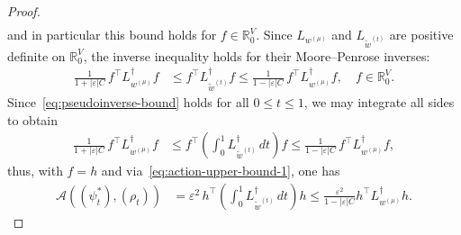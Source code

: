 \documentclass[11pt,a4paper]{article}
\begin{document}
\begin{proof}
\begin{align*}
        \end{align*}
    and in particular this bound holds for $f\in\mathbb{R}^{V}_0$. Since $L_{w^{(\mu)}}$ and $L_{\widetilde{w}^{(t)}}$ are positive definite on $\mathbb{R}^{V}_0$, the inverse inequality holds for their Moore--Penrose inverses:
        \begin{align}\label{eq:pseudoinverse-bound}
            \frac{1}{1 + |\varepsilon| C} \, f^\top L_{w^{(\mu)}}^{\dagger} f &\leq f^\top L_{\widetilde{w}^{(t)}}^{\dagger} f \leq \frac{1}{1 - |\varepsilon| C} \, f^\top L_{w^{(\mu)}}^{\dagger} f,\quad f\in\mathbb{R}^{V}_0.
        \end{align}
    Since~\cref{eq:pseudoinverse-bound} holds for all $0\le t\le 1$, we may integrate all sides to obtain
        \begin{align*}
            \frac{1}{1 + |\varepsilon| C} \, f^\top L_{w^{(\mu)}}^{\dagger} f &\leq f^\top \left( \int_0^{1} L_{\widetilde{w}^{(t)}}^{\dagger} \, dt \right) f \leq \frac{1}{1 - |\varepsilon| C} \, f^\top L_{w^{(\mu)}}^{\dagger} f,
        \end{align*}
    thus, with $f=h$ and via~\cref{eq:action-upper-bound-1}, one has
        \begin{align}\label{eq:pseudoinverse-bound-2}
            \mathcal{A}((\psi_t^\ast), (\rho_t)) &= \varepsilon^2 \, h^\top \left( \int_0^{1} L_{\widetilde{w}^{(t)}}^{\dagger} \, dt \right) h \leq \frac{\varepsilon^2}{1-|\varepsilon| C} h^\top L_{w^{(\mu)}}^{\dagger} h.
        \end{align}
    

\end{proof}
\end{document}
